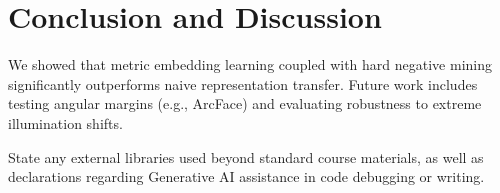 \documentclass{article}
\begin{document}
\section{Conclusion and Discussion}
\label{sec:conclusion}
We showed that metric embedding learning coupled with hard negative mining significantly outperforms naive representation transfer. Future work includes testing angular margins (e.g., ArcFace) and evaluating robustness to extreme illumination shifts.

\begin{ack}
State any external libraries used beyond standard course materials, as well as declarations regarding Generative AI assistance in code debugging or writing.
\end{ack}



\end{document}
